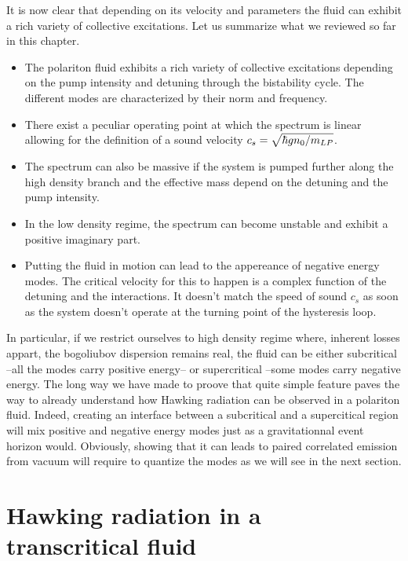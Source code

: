 \bigskip



It is now clear that depending on its velocity and parameters the fluid can exhibit a rich variety of collective excitations. Let us summarize what we reviewed  so far in this chapter.
\begin{tcolorbox}[infernoSummary]
    \begin{itemize}
        \item The polariton fluid exhibits a rich variety of collective excitations depending on the pump intensity and detuning through the bistability cycle. The different 
        modes are characterized by their norm and frequency.
        \item There exist a peculiar operating point at which the spectrum is linear allowing for the definition of a sound velocity $c_s=\sqrt{\hbar g n_0/m_{LP}}$.
        \item The spectrum can also be massive if the system is pumped further along the high density branch and the effective mass depend on the detuning and the pump intensity.
        \item In the low density regime, the spectrum can become unstable and exhibit a positive imaginary part. 
        \item Putting the fluid in motion can lead to the appereance of negative energy modes. The critical velocity for this to happen is a complex function of the detuning and the interactions. It doesn't 
         match the speed of sound $c_s$ as soon as the system doesn't operate at the turning point of the hysteresis loop.
    \end{itemize}
    \end{tcolorbox}


In particular, if we restrict ourselves to high density regime where, inherent losses appart, the bogoliubov dispersion remains real, the fluid can be either subcritical --all the modes carry positive energy-- or supercritical --some modes carry negative energy.
The long way we have made to proove that quite simple feature paves the way to already understand how Hawking radiation can be observed in a polariton fluid. Indeed, creating 
an interface between a subcritical and a supercitical region will mix positive and negative energy modes just as a gravitationnal event horizon would. Obviously, 
 showing that it can leads to paired correlated emission from vacuum will require to quantize the modes as we will see in the next section.

\section{Hawking radiation in a transcritical fluid}
 


